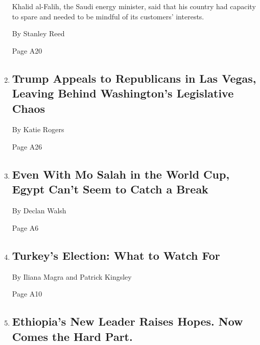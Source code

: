 \begin{enumerate}
  Khalid al-Falih, the Saudi energy minister, said that his country had
  capacity to spare and needed to be mindful of its customers'
  interests.

  By Stanley Reed

  Page A20
\item
  \href{/2018/06/23/us/politics/trump-nevada-republican-convention.html}{}

  \hypertarget{trump-appeals-to-republicans-in-las-vegas-leaving-behind-washingtons-legislative-chaos}{%
  \subsection{Trump Appeals to Republicans in Las Vegas, Leaving Behind
  Washington's Legislative
  Chaos}\label{trump-appeals-to-republicans-in-las-vegas-leaving-behind-washingtons-legislative-chaos}}

  By Katie Rogers

  Page A26
\item
  \href{/2018/06/23/world/middleeast/world-cup-mohamed-salah-egypt.html}{}

  \hypertarget{even-with-mo-salah-in-the-world-cup-egypt-cant-seem-to-catch-a-break}{%
  \subsection{Even With Mo Salah in the World Cup, Egypt Can't Seem to
  Catch a
  Break}\label{even-with-mo-salah-in-the-world-cup-egypt-cant-seem-to-catch-a-break}}

  By Declan Walsh

  Page A6
\item
  \href{/2018/06/23/world/asia/turkey-elections.html}{}

  \hypertarget{turkeys-election-what-to-watch-for}{%
  \subsection{Turkey's Election: What to Watch
  For}\label{turkeys-election-what-to-watch-for}}

  By Iliana Magra and Patrick Kingsley

  Page A10
\item
  \href{/2018/06/23/world/africa/abiy-ahmed-ethiopia.html}{}

  \hypertarget{ethiopias-new-leader-raises-hopes-now-comes-the-hard-part}{%
  \subsection{Ethiopia's New Leader Raises Hopes. Now Comes the Hard
  Part.}\label{ethiopias-new-leader-raises-hopes-now-comes-the-hard-part}}


\end{enumerate}
